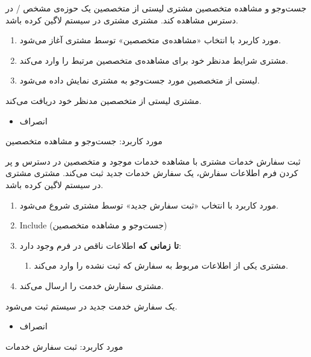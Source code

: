 

\usecase
{جست‌وجو و مشاهده متخصصین}
{}
{
	مشتری لیستی از متخصصین یک حوزه‌ی مشخص / در دسترس مشاهده کند.
}
{مشتری}
{}
{
	مشتری در سیستم لاگین کرده باشد.
}
{
	\vspace*{-0.6cm}
	\begin{enumerate}
		\item 
		مورد کاربرد با انتخاب «مشاهده‌ی متخصصین» توسط مشتری آغاز می‌شود.
		\item 
		مشتری شرایط مدنظر خود برای مشاهده‌ی متخصصین مرتبط را وارد می‌کند.
		\item 
		لیستی از متخصصین مورد جست‌وجو به مشتری نمایش داده می‌شود.
	\end{enumerate}
}
{مشتری لیستی از متخصصین مدنظر خود دریافت می‌کند.}
{
	\begin{itemize}
		\vspace*{-0.6cm}
		\item انصراف
	\end{itemize}
}
{
	مورد کاربرد: جست‌وجو و مشاهده متخصصین
}

\usecase
{ثبت سفارش خدمات}
{}
{
	مشتری با مشاهده خدمات موجود و متخصصین در دسترس و پر کردن فرم اطلاعات سفارش، یک سفارش خدمات جدید ثبت می‌کند.
}
{مشتری}
{}
{
	مشتری در سیستم لاگین کرده باشد.
}
{
	\vspace*{-0.6cm}
	\begin{enumerate}
		\item 
		مورد کاربرد با انتخاب «ثبت سفارش جدید» توسط مشتری شروع می‌شود.
		\item 
		Include (جست‌وجو و مشاهده متخصصین)
		\item 
		\textbf{تا زمانی که}
		اطلاعات ناقص در فرم وجود دارد:
		\begin{enumerate}[label=\theenumi.\arabic*.]
			\item 
			مشتری یکی از اطلاعات مربوط به سفارش که ثبت نشده را وارد می‌کند.
		\end{enumerate}
		\item 
		مشتری سفارش خدمت را ارسال می‌کند.
		
	\end{enumerate}
}
{یک سفارش خدمت جدید در سیستم ثبت می‌شود.}
{
	\begin{itemize}
		\vspace*{-0.6cm}
		\item انصراف
	\end{itemize}
}
{
	مورد کاربرد: ثبت سفارش خدمات
}

